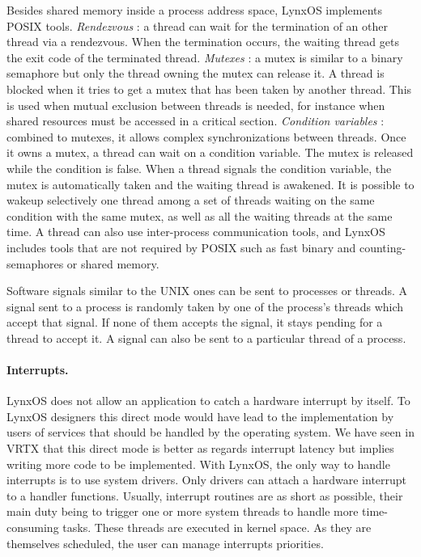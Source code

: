 \documentclass[10pt]{report}
\begin{document}
Besides shared memory inside a process address space, LynxOS implements POSIX tools. {\em Rendezvous} : a thread can wait
for the termination of an other thread via a rendezvous. When the termination occurs, the waiting thread gets the exit code of the
terminated thread. {\em Mutexes} : a mutex is similar to a binary semaphore but only the thread owning the mutex can release it.
A thread is blocked when it tries to get a mutex that has been taken by another thread. This is used when mutual exclusion between threads
is needed, for instance when shared resources must be accessed in a critical section. {\em Condition variables} : combined to mutexes,
it allows complex synchronizations between threads. Once it owns a mutex, a thread can wait on a condition variable. The mutex is released
while the condition is false. When a thread signals the condition variable, the mutex is automatically taken and the waiting thread is
awakened. It is possible to wakeup selectively one thread among a set of threads waiting on the same condition with the same mutex, as well
as all the waiting threads at the same time. A thread can also use inter-process communication tools, and LynxOS includes tools that
are not required by POSIX such as fast binary and counting-semaphores or shared memory.

Software signals similar to the UNIX ones can be sent to processes or threads. A signal sent to a process is randomly taken by one of the
process's threads which accept that signal. If none of them accepts the signal, it stays pending for a thread to accept it. A signal can also
be sent to a particular thread of a process.

\paragraph{Interrupts.} LynxOS does not allow an application to catch a hardware interrupt by itself. To LynxOS designers
this direct mode would have lead to the implementation by users of services that should be handled by the operating system. We have seen
in VRTX that this direct mode is better as regards interrupt latency but implies writing more code to be implemented. With LynxOS, the only
way to handle interrupts is to use system drivers. Only drivers can attach a hardware interrupt to a handler functions. Usually,
interrupt routines are as short as possible, their main duty being to trigger one or more system threads to handle more time-consuming tasks.
These threads are executed in kernel space. As they are themselves scheduled, the user can manage interrupts priorities.
\end{document}
